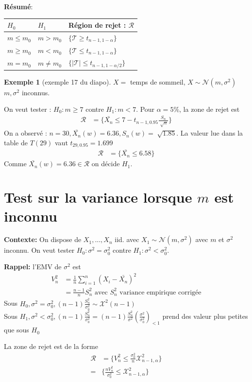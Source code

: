 \documentclass{article}
\theoremstyle{plain}%
\theoremstyle{definition}
\newtheorem{exmp}{Exemple}[section]
\theoremstyle{remark}
\begin{document}
\textbf{Résumé}: 
\begin{table}[!ht]
    \centering
    \begin{tabular}{|l|l|l|}
    \hline
        $H_0$ & $H_1$ & Région de rejet : $\mathcal{R}$ \\ \hline
        $ m \leq m_0 $ & $ m > m_0 $ & $ \{\mathcal{T} \geq t_{n-1,1-\alpha}\} $ \\ \hline
        $ m \geq m_0 $ & $ m < m_0 $ & $ \{\mathcal{T} \leq t_{n-1,1-\alpha}\} $ \\ \hline
        $ m = m_0 $ & $ m \neq m_0 $ & $ \{\left| \mathcal{T}  \right| \leq  t_{n-1,1-\alpha/2}\} $ \\ \hline
    \end{tabular}
\end{table}

\begin{exmp}[exemple 17 du diapo]
    $ X=$ temps de sommeil, $ X \sim \mathcal{N}(m ,\sigma ^2) $ $ m, \sigma ^2 $ inconnus. 

    On veut tester : $ H_0: m \geq 7 $ contre $ H_1: m<7 $. Pour $ \alpha =5\% $, la zone de rejet est 
    \begin{align*}
        \mathcal{R} &= \{\bar{X_n} \leq 7 - t_{n-1, 0.95} \frac{S_n}{\sqrt[]{n}}\}
    \end{align*}
    On a observé : $ n=30, \bar{X_n}(w) = 6.36, S_n(w) = \sqrt[]{1.85} $. La valeur lue dans la table de $ T(29) $ vaut $ t_{29, 0.95} = 1.699 $ 
    \begin{align*}
        \mathcal{R} &= \{\bar{X_n} \leq 6.58 \} 
    \end{align*}
    Comme $ \bar{X_n}(w) = 6.36 \in \mathcal{R} $ on décide $ H_1 $. 
\end{exmp}

\section{Test sur la variance lorsque $ m $ est inconnu}

\textbf{Contexte:} On dispose de $ X_1, \dots, X_n $ iid. avec $ X_1 \sim \mathcal{N}(m, \sigma^2) $ avec $ m $ et $ \sigma ^2 $ inconnu. On veut tester $ H_0: \sigma ^2 = \sigma _0^2$ contre $ H_1: \sigma ^2 < \sigma _0^2$. 

\textbf{Rappel:} l'EMV de $ \sigma ^2 $ est 
\begin{align*}
    V_n^2 &= \frac{1}{n} \sum_{i=1}^{n}(X_i - \bar{X_n})^2 \\
        &= \frac{n-1}{n}S_n^2 \text{ avec } S_n^2 \text{ variance empirique corrigée}
\end{align*}
Sous $ H_0, \sigma ^2 = \sigma _0^2, (n-1)\frac{S_n^2}{\sigma _0^2} \sim \mathcal{X}^2 (n-1)$ \\
Sous $ H_1, \sigma ^2 < \sigma _0^2, (n-1)\frac{S_n^2}{\sigma _0^2} = (n-1) \frac{S_n^2}{\sigma ^2} (\frac{\sigma ^2}{\sigma _0^2})_{<1} $ prend des valeur plus petites que sous $ H_0 $

La zone de rejet est de la forme 
\begin{align*}
    \mathcal{R} &= \{V_n^2 \leq \frac{\sigma _0^2}{n} \mathcal{X}^2_{n-1, \alpha }\} \\
        =& \{ \frac{n V_n^2}{\sigma _0^2}\leq \mathcal{X}^2 _{n-1, \alpha }\}
\end{align*}
\end{document}
